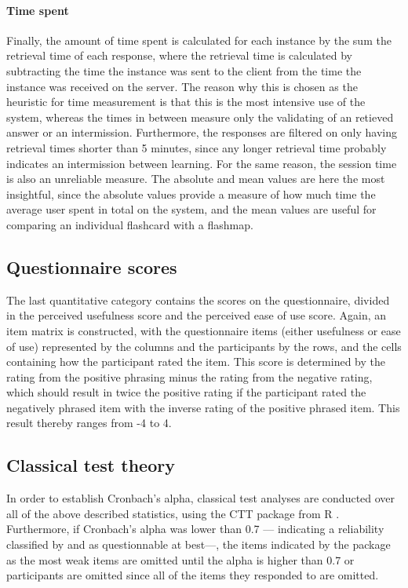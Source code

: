 \paragraph{Time spent} Finally, the amount of time spent is calculated for each instance by the sum the retrieval time of each response, where the retrieval time is calculated by subtracting the time the instance was sent to the client from the time the instance was received on the server. The reason why this is chosen as the heuristic for time measurement is that this is the most intensive use of the system, whereas the times in between measure only the validating of an retieved answer or an intermission. Furthermore, the responses are filtered on only having retrieval times shorter than 5 minutes, since any longer retrieval time probably indicates an intermission between learning. For the same reason, the session time is also an unreliable measure. The absolute and mean values are here the most insightful, since the absolute values provide a measure of how much time the average user spent in total on the system, and the mean values are useful for comparing an individual flashcard with a flashmap. 

\subsection{Questionnaire scores}

The last quantitative category contains the scores on the questionnaire, divided in the perceived usefulness score and the perceived ease of use score. Again, an item matrix is constructed, with the questionnaire items (either usefulness or ease of use) represented by the columns and the participants by the rows, and the cells containing how the participant rated the item. This score is determined by the rating from the positive phrasing minus the rating from the negative rating, which should result in twice the positive rating if the participant rated the negatively phrased item with the inverse rating of the positive phrased item. This result thereby ranges from -4 to 4.

\subsection{Classical test theory}

In order to establish Cronbach's alpha, classical test analyses are conducted over all of the above described statistics, using the CTT package from R \cite{ctt}. Furthermore, if Cronbach's alpha was lower than 0.7 --- indicating a reliability classified by  and  as questionnable at best---, the items indicated by the package as the most weak items are omitted until the alpha is higher than 0.7 or participants are omitted since all of the items they responded to are omitted.

